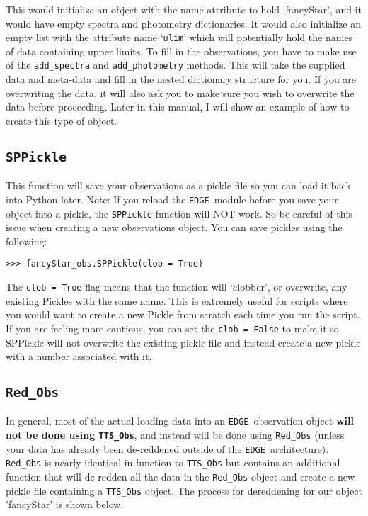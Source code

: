 \documentclass{article}
\newcommand{\edge}{\texttt{EDGE }}
\begin{document}
This would initialize an object with the name attribute to hold `fancyStar', and it would have empty spectra and photometry dictionaries. It would also initialize an empty list with the attribute name ‘\texttt{ulim}’ which will potentially hold the names of data containing upper limits. 
To fill in the observations, you have to make use of the \texttt{add\_spectra} and \texttt{add\_photometry} methods. This will take the supplied data and meta-data and fill in the nested dictionary structure for you. If you are overwriting the data, it will also ask you to make sure you wish to overwrite the data before proceeding. Later in this manual, I will show an example of how to create this type of object. 
 
\subsection{\texttt{SPPickle}}
 
This function will save your observations as a pickle file so you can load it back into Python later. Note: If you reload the \edge module before you save your object into a pickle, the \texttt{SPPickle} function will NOT work. So be careful of this issue when creating a new observations object. You can save pickles using the following:

\vspace{2mm}
\texttt{>>> fancyStar\_obs.SPPickle(clob = True)}
\vspace{2mm}

\noindent The \texttt{clob = True} flag means that the function will `clobber', or overwrite, any existing Pickles with the same name. This is extremely useful for scripts where you would want to create a new Pickle from scratch each time you run the script. If you are feeling more cautious, you can set the \texttt{clob = False} to make it so SPPickle will not overwrite the existing pickle file and instead create a new pickle with a number associated with it.

\subsection{\texttt{Red\_Obs}}

In general, most of the actual loading data into an \edge observation object \textbf{will not be done using \texttt{TTS\_Obs}}, and instead will be done using \texttt{Red\_Obs} (unless your data has already been de-reddened outside of the \edge architecture). \texttt{Red\_Obs} is nearly identical in function to \texttt{TTS\_Obs} but contains an additional function that will de-redden all the data in the \texttt{Red\_Obs} object and create a new pickle file containing a \texttt{TTS\_Obs} object.
The process for dereddening for our object 'fancyStar' is shown below.
\end{document}

